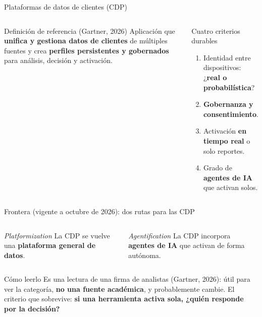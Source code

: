 \documentclass[aspectratio=169,xcolor=dvipsnames]{beamer}
\begin{document}
\begin{frame}{Plataformas de datos de clientes (CDP)}
\begin{columns}[T]
  \begin{block}{Definición de referencia (Gartner, 2026)}
    \small Aplicación que \textbf{unifica y gestiona datos de clientes} de múltiples fuentes y crea \textbf{perfiles persistentes y gobernados} para análisis, decisión y activación.
  \end{block}
  \begin{exampleblock}{Cuatro criterios durables}
    \scriptsize
    \begin{enumerate}
      \item Identidad entre dispositivos: ¿\textbf{real o probabilística}?
      \item \textbf{Gobernanza y consentimiento}.
      \item Activación \textbf{en tiempo real} o solo reportes.
      \item Grado de \textbf{agentes de IA} que activan solos.
    \end{enumerate}
  \end{exampleblock}
\end{columns}
\end{frame}

\begin{frame}{Frontera (vigente a octubre de 2026): dos rutas para las CDP}
\begin{columns}[T]
  \begin{block}{\textit{Platformization}}
    \small La CDP se vuelve una \textbf{plataforma general de datos}.
  \end{block}
  \begin{block}{\textit{Agentification}}
    \small La CDP incorpora \textbf{agentes de IA} que activan de forma autónoma.
  \end{block}
\end{columns}
\vspace{6pt}
\begin{alertblock}{Cómo leerlo}
  \small Es una lectura de una firma de analistas (Gartner, 2026): útil para ver la categoría, \textbf{no una fuente académica}, y probablemente cambie. El criterio que sobrevive: \textbf{si una herramienta activa sola, ¿quién responde por la decisión?}
\end{alertblock}
\end{frame}
\end{document}
